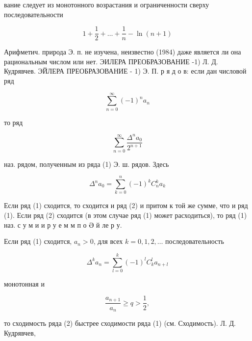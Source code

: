 \documentclass[10pt]{article}
\begin{document}
вание следует из монотонного возрастания и ограниченности сверху последовательности



\[

1+\frac{1}{2}+\ldots+\frac{1}{n}-\ln (n+1)

\]



Арифметич. природа Э. п. не изучена, неизвестно (1984) даже является ли она рациональным числом или нет. ЭИЛЕРА ПРЕОБРАЗОВАНИЕ -1) Л. Д. Кудрявчев. ЭЙЛЕРА ПРЕОБРАЗОВАНИЕ - 1) Э. П. р я д о в: если дан числовой ряд



\[

\sum_{n=0}^{\infty}(-1)^{n} a_{n}

\]



то ряд



\[

\sum_{n=0}^{\infty} \frac{\Delta^{n} a_{0}}{2^{n+1}}

\]



наз. рядом, полученным из ряда (1) Э. ш. рядов. Здесь



\[

\Delta^{n} a_{0}=\sum_{k=0}^{n}(-1)^{k} C_{n}^{k} a_{k}

\]



Если ряд (1) сходится, то сходится и ряд (2) и притом к той же сумме, что и ряд (1). Если ряд (2) сходится (в этом случае ряд (1) может расходиться), то ряд (1) наз. с у м и и р у е м м п о Ә й ле р у.



Если ряд (1) сходится, $a_{n}>0$, для всех $k=0,1,2, \ldots$ последовательность



\[

\Delta^{k} a_{n}=\sum_{l=0}^{k}(-1)^{l} C_{k}^{l} a_{n+l}

\]



монотонная и



\[

\frac{a_{n+1}}{a_{n}} \geqslant q>\frac{1}{2},

\]



то сходимость ряда (2) быстрее сходимости ряда (1) (см. Сходимость). Л. Д. Кудрявчев,
\end{document}
